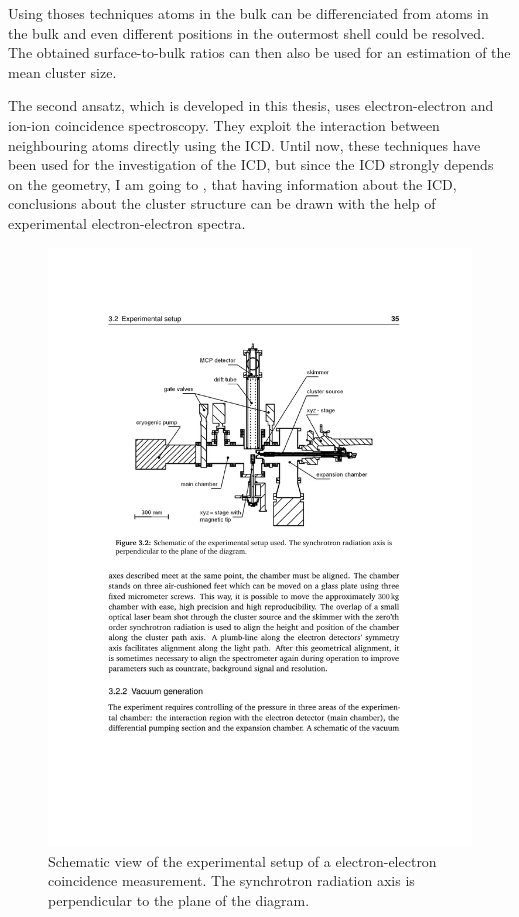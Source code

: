 Using thoses techniques atoms in the bulk can be differenciated from atoms
in the bulk and even different positions in the
outermost shell could be resolved. The obtained surface-to-bulk ratios
can then also be used for an estimation of the mean cluster size.

The second ansatz, which is developed in this thesis, uses electron-electron
and ion-ion coincidence spectroscopy.
They exploit the interaction between neighbouring atoms
directly using the ICD.
Until now, these techniques
have been used for the investigation of the
\ac{ICD}, but since the ICD strongly depends on the geometry, I am going to
, that having information about the ICD, conclusions about
the cluster structure can be drawn with the help of experimental
electron-electron spectra.

\begin{figure}[h]
  \centering
  \includegraphics[]{pics/exp_setup_overview.pdf}
  \caption{Schematic view of the experimental setup of a electron-electron
           coincidence measurement. The synchrotron radiation axis
           is perpendicular to the plane of the diagram.}
  \label{figure:exp_setup_overview}
\end{figure}

